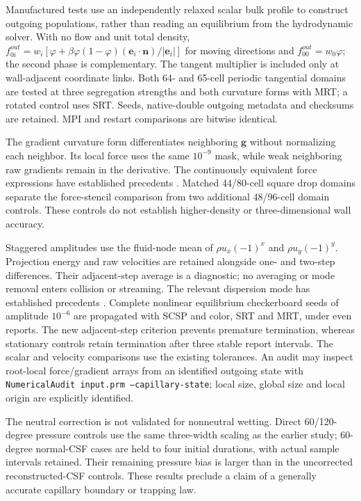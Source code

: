 \documentclass[11pt]{article}
\begin{document}
Manufactured tests use an independently relaxed scalar bulk profile to
construct outgoing populations, rather than reading an equilibrium from
the hydrodynamic solver. With no flow and unit total density,
$f_{0i}^{out}=w_i[\varphi+\beta\varphi(1-\varphi)
 (\bm e_i\cdot\bm n)/|\bm e_i|]$ for moving directions and
$f_{00}^{out}=w_0\varphi$; the second phase is complementary.
The tangent multiplier is included only at wall-adjacent coordinate links.
Both 64- and 65-cell periodic tangential domains are tested at three
segregation strengths and both curvature forms with MRT; a rotated control
uses SRT. Seeds, native-double outgoing metadata and checksums are retained.
MPI and restart comparisons are bitwise identical.

The gradient curvature form differentiates neighboring $\bm g$ without
normalizing each neighbor. Its local force uses the same $10^{-9}$ mask,
while weak neighboring raw gradients remain in the derivative.
The continuously equivalent force expressions have established precedents
\cite{sugimoto2026}. Matched 44/80-cell square drop domains separate the
force-stencil comparison from two additional 48/96-cell domain controls.
These controls do not establish higher-density or three-dimensional wall
accuracy.

Staggered amplitudes use the fluid-node mean of $\rho u_x(-1)^x$ and
$\rho u_y(-1)^y$. Projection energy and raw velocities are retained alongside
one- and two-step differences. Their adjacent-step average is a diagnostic;
no averaging or mode removal enters collision or streaming. The relevant
dispersion mode has established precedents \cite{lallemand2000,guo2011}.
Complete nonlinear equilibrium checkerboard seeds of amplitude $10^{-6}$
are propagated with SCSP and color, SRT and MRT, under even reports.
The new adjacent-step criterion prevents premature termination, whereas
stationary controls retain termination after three stable report intervals.
The scalar and velocity comparisons use the existing tolerances.
An audit may inspect root-local force/gradient arrays from an identified
outgoing state with \texttt{NumericalAudit input.prm --capillary-state};
local size, global size and local origin are explicitly identified.

The neutral correction is not validated for nonneutral wetting. Direct
60/120-degree pressure controls use the same three-width scaling as the
earlier study; 60-degree normal-CSF cases are held to four initial durations,
with actual sample intervals retained. Their remaining pressure bias is
larger than in the uncorrected reconstructed-CSF controls. These results
preclude a claim of a generally accurate capillary boundary or trapping law.
\end{document}
